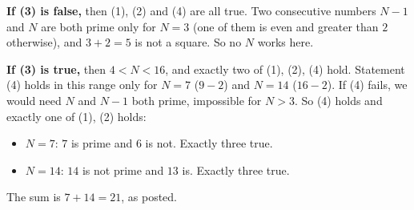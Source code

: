 \textbf{If (3) is false,} then (1), (2) and (4) are all true. Two consecutive numbers $N-1$ and $N$ are both prime only for $N=3$ (one of them is even and greater than $2$ otherwise), and $3+2=5$ is not a square. So no $N$ works here.

\textbf{If (3) is true,} then $4<N<16$, and exactly two of (1), (2), (4) hold. Statement (4) holds in this range only for $N=7$ ($9-2$) and $N=14$ ($16-2$). If (4) fails, we would need $N$ and $N-1$ both prime, impossible for $N>3$. So (4) holds and exactly one of (1), (2) holds:
\begin{itemize}
\item $N=7$: $7$ is prime and $6$ is not. Exactly three true.
\item $N=14$: $14$ is not prime and $13$ is. Exactly three true.
\end{itemize}
The sum is $7+14=\boxed{21}$, as posted.

